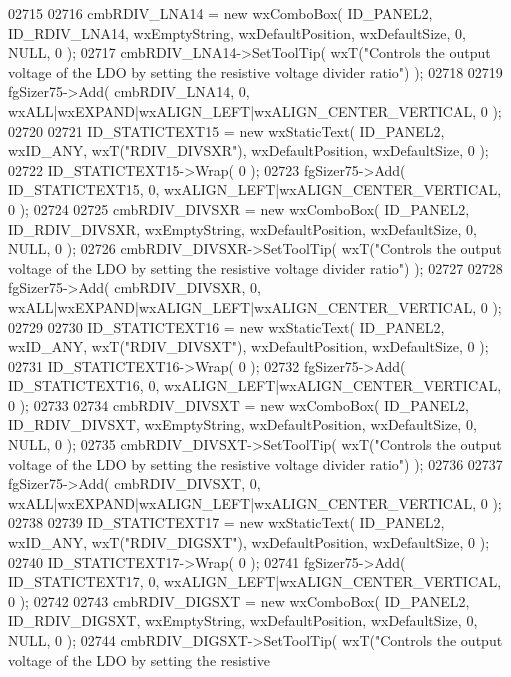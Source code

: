 \begin{DoxyCode}
02715     
02716     cmbRDIV_LNA14 = \textcolor{keyword}{new} wxComboBox( ID_PANEL2, ID_RDIV_LNA14, wxEmptyString, wxDefaultPosition, 
      wxDefaultSize, 0, NULL, 0 ); 
02717     cmbRDIV_LNA14->SetToolTip( wxT(\textcolor{stringliteral}{"Controls the output voltage of the LDO by setting the resistive voltage
       divider ratio"}) );
02718     
02719     fgSizer75->Add( cmbRDIV_LNA14, 0, wxALL|wxEXPAND|wxALIGN\_LEFT|wxALIGN\_CENTER\_VERTICAL, 0 );
02720     
02721     ID_STATICTEXT15 = \textcolor{keyword}{new} wxStaticText( ID_PANEL2, wxID\_ANY, wxT(\textcolor{stringliteral}{"RDIV\_DIVSXR"}), wxDefaultPosition, 
      wxDefaultSize, 0 );
02722     ID_STATICTEXT15->Wrap( 0 );
02723     fgSizer75->Add( ID_STATICTEXT15, 0, wxALIGN\_LEFT|wxALIGN\_CENTER\_VERTICAL, 0 );
02724     
02725     cmbRDIV_DIVSXR = \textcolor{keyword}{new} wxComboBox( ID_PANEL2, ID_RDIV_DIVSXR, wxEmptyString, wxDefaultPosition, 
      wxDefaultSize, 0, NULL, 0 ); 
02726     cmbRDIV_DIVSXR->SetToolTip( wxT(\textcolor{stringliteral}{"Controls the output voltage of the LDO by setting the resistive
       voltage divider ratio"}) );
02727     
02728     fgSizer75->Add( cmbRDIV_DIVSXR, 0, wxALL|wxEXPAND|wxALIGN\_LEFT|wxALIGN\_CENTER\_VERTICAL, 0 );
02729     
02730     ID_STATICTEXT16 = \textcolor{keyword}{new} wxStaticText( ID_PANEL2, wxID\_ANY, wxT(\textcolor{stringliteral}{"RDIV\_DIVSXT"}), wxDefaultPosition, 
      wxDefaultSize, 0 );
02731     ID_STATICTEXT16->Wrap( 0 );
02732     fgSizer75->Add( ID_STATICTEXT16, 0, wxALIGN\_LEFT|wxALIGN\_CENTER\_VERTICAL, 0 );
02733     
02734     cmbRDIV_DIVSXT = \textcolor{keyword}{new} wxComboBox( ID_PANEL2, ID_RDIV_DIVSXT, wxEmptyString, wxDefaultPosition, 
      wxDefaultSize, 0, NULL, 0 ); 
02735     cmbRDIV_DIVSXT->SetToolTip( wxT(\textcolor{stringliteral}{"Controls the output voltage of the LDO by setting the resistive
       voltage divider ratio"}) );
02736     
02737     fgSizer75->Add( cmbRDIV_DIVSXT, 0, wxALL|wxEXPAND|wxALIGN\_LEFT|wxALIGN\_CENTER\_VERTICAL, 0 );
02738     
02739     ID_STATICTEXT17 = \textcolor{keyword}{new} wxStaticText( ID_PANEL2, wxID\_ANY, wxT(\textcolor{stringliteral}{"RDIV\_DIGSXT"}), wxDefaultPosition, 
      wxDefaultSize, 0 );
02740     ID_STATICTEXT17->Wrap( 0 );
02741     fgSizer75->Add( ID_STATICTEXT17, 0, wxALIGN\_LEFT|wxALIGN\_CENTER\_VERTICAL, 0 );
02742     
02743     cmbRDIV_DIGSXT = \textcolor{keyword}{new} wxComboBox( ID_PANEL2, ID_RDIV_DIGSXT, wxEmptyString, wxDefaultPosition, 
      wxDefaultSize, 0, NULL, 0 ); 
02744     cmbRDIV_DIGSXT->SetToolTip( wxT(\textcolor{stringliteral}{"Controls the output voltage of the LDO by setting the resistive
}
\end{DoxyCode}
